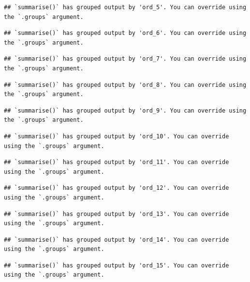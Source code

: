 \documentclass[
]{book}
\begin{document}
\begin{verbatim}
## `summarise()` has grouped output by 'ord_5'. You can override using the `.groups` argument.
\end{verbatim}

\begin{verbatim}
## `summarise()` has grouped output by 'ord_6'. You can override using the `.groups` argument.
\end{verbatim}

\begin{verbatim}
## `summarise()` has grouped output by 'ord_7'. You can override using the `.groups` argument.
\end{verbatim}

\begin{verbatim}
## `summarise()` has grouped output by 'ord_8'. You can override using the `.groups` argument.
\end{verbatim}

\begin{verbatim}
## `summarise()` has grouped output by 'ord_9'. You can override using the `.groups` argument.
\end{verbatim}

\begin{verbatim}
## `summarise()` has grouped output by 'ord_10'. You can override using the `.groups` argument.
\end{verbatim}

\begin{verbatim}
## `summarise()` has grouped output by 'ord_11'. You can override using the `.groups` argument.
\end{verbatim}

\begin{verbatim}
## `summarise()` has grouped output by 'ord_12'. You can override using the `.groups` argument.
\end{verbatim}

\begin{verbatim}
## `summarise()` has grouped output by 'ord_13'. You can override using the `.groups` argument.
\end{verbatim}

\begin{verbatim}
## `summarise()` has grouped output by 'ord_14'. You can override using the `.groups` argument.
\end{verbatim}

\begin{verbatim}
## `summarise()` has grouped output by 'ord_15'. You can override using the `.groups` argument.
\end{verbatim}
\end{document}
